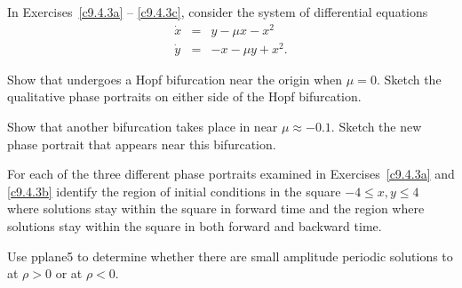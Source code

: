 \documentclass{ximera}
\begin{document}
\noindent In Exercises~\ref{c9.4.3a} -- \ref{c9.4.3c}, 
consider the system of differential equations 
\begin{equation*}  \label{E:duff}
\begin{array}{rcl}
\dot{x} & = & y - \mu x - x^2   \\
\dot{y} & = & -x - \mu y + x^2.
\end{array}
\end{equation*}
\begin{exercise} \label{c9.4.3a}
Show that  undergoes a Hopf bifurcation near the origin when 
$\mu=0$.  Sketch the qualitative phase portraits on either 
side of the Hopf bifurcation.
\end{exercise}
\begin{exercise} \label{c9.4.3b}
Show that another bifurcation takes place in  near 
$\mu\approx -0.1$.  Sketch the new phase portrait that appears near this 
bifurcation.    
\end{exercise}
\begin{exercise} \label{c9.4.3c}
For each of the three different phase portraits examined in 
Exercises~\ref{c9.4.3a} and \ref{c9.4.3b} identify the region of initial 
conditions in the square $-4\leq x,y \leq 4$ where solutions stay within the 
square in forward time and the region where solutions stay within the square 
in both forward and backward time.
\end{exercise}

\begin{exercise} \label{c9.4.4}
Use {\sf pplane5} to determine whether there are small amplitude periodic 
solutions to  at $\rho>0$ or at $\rho<0$.
\end{exercise}
\end{document}
